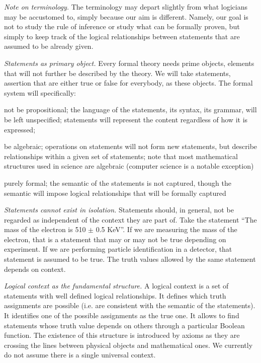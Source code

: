 \documentclass[twocolumn]{article}
\begin{document}
\emph{Note on terminology.} The terminology may depart slightly from what logicians may be accustomed to, simply because our aim is different. Namely, our goal is not to study the rule of inference or study what can be formally proven, but simply to keep track of the logical relationships between statements that are assumed to be already given.

\emph{Statements as primary object.} Every formal theory needs prime objects, elements that will not further be described by the theory. We will take statements, assertion that are either true or false for everybody, as these objects. The formal system will specifically:
\begin{description}
	\item not be propositional; the language of the statements, its syntax, its grammar, will be left unspecified; statements will represent the content regardless of how it is expressed;
	\item be algebraic; operations on statements will not form new statements, but describe relationships within a given set of statements; note that most mathematical structures used in science are algebraic (computer science is a notable exception)
	\item purely formal; the semantic of the statements is not captured, though the semantic will impose logical relationships that will be formally captured
\end{description}

\emph{Statements cannot exist in isolation.} Statements should, in general, not be regarded as independent of the context they are part of. Take the statement ``The mass of the electron is 510 $\pm$ 0.5 KeV''. If we are measuring the mass of the electron, that is a statement that may or may not be true depending on experiment. If we are performing particle identification in a detector, that statement is assumed to be true. The truth values allowed by the same statement depends on context.

\emph{Logical context as the fundamental structure.} A logical context is a set of statements with well defined logical relationships. It defines which truth assignments are possible (i.e. are consistent with the semantic of the statements). It identifies one of the possible assignments as the true one. It allows to find statements whose truth value depends on others through a particular Boolean function. The existence of this structure is introduced by axioms as they are crossing the lines between physical objects and mathematical ones. We currently do not assume there is a single universal context.
\end{document}
